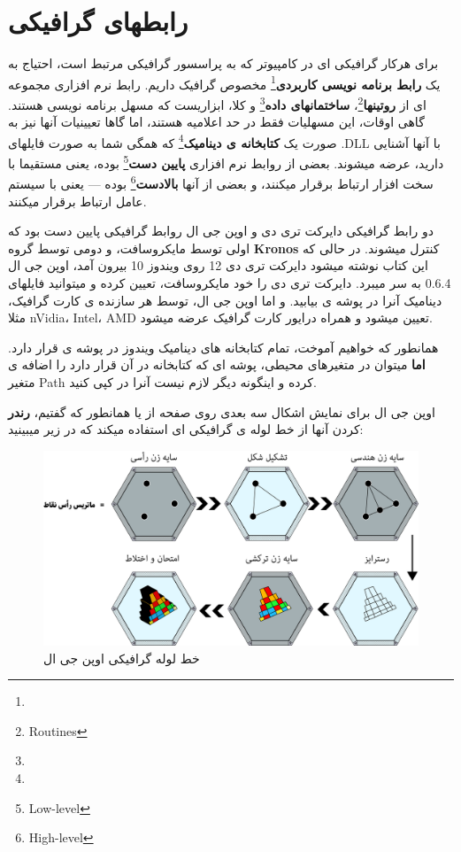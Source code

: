 \documentclass[14pt,a4paper]{memoir}
\begin{document}
	 \section{رابطهای گرافیکی}\label{api}	 
	  
	  
	  برای هرکار گرافیکی ای در کامپیوتر که به پراسسور گرافیکی مرتبط است، احتیاج به یک \textbf{رابط برنامه نویسی کاربردی}\footnote{} مخصوص گرافیک داریم. رابط نرم افزاری مجموعه ای از \textbf{روتینها}\footnote{Routines}، \textbf{ساختمانهای داده}\footnote{} و کلا، ابزاریست که مسهل برنامه نویسی هستند. گاهی اوقات، این مسهلیات فقط در حد اعلامیه هستند، اما گاها تعیینیات آنها نیز به صورت یک \textbf{کتابخانه ی دینامیک}\footnote{} که همگی شما به صورت فایلهای .DLL با آنها آشنایی دارید، عرضه میشوند. بعضی از روابط نرم افزاری \textbf{پایین دست}\footnote{Low-level} بوده، یعنی مستقیما با سخت افزار ارتباط برقرار میکنند، و بعضی از آنها \textbf{بالادست}\footnote{High-level} بوده --- یعنی با سیستم عامل ارتباط برقرار میکنند. 
	  
	  
	 دو رابط گرافیکی دایرکت تری دی و  اوپن جی ال روابط گرافیکی پایین دست بود که اولی توسط مایکروسافت، و دومی توسط گروه \textbf{Kronos} کنترل میشوند. در حالی که این کتاب نوشته میشود دایرکت تری دی 12 روی ویندوز 10 بیرون آمد، اوپن جی ال 0.6.4 به سر میبرد. دایرکت تری دی را خود مایکروسافت، تعیین کرده و میتوانید فایلهای دینامیک آنرا در پوشه ی \textbf{} بیابید. و اما اوپن جی ال، توسط هر سازنده ی کارت گرافیک، مثلا nVidia، Intel، AMD تعیین میشود و همراه درایور کارت گرافیک عرضه میشود.
	 
	 \begin{tip}
	 	همانطور که خواهیم آموخت، تمام کتابخانه های دینامیک ویندوز در پوشه ی   قرار دارد. \textbf{اما} میتوان در متغیرهای محیطی، پوشه ای که کتابخانه در آن قرار دارد را اضافه ی متغیر Path کرده و اینگونه دیگر لازم نیست آنرا در  کپی کنید.
	 \end{tip} 
	 
	 
	 
	 اوپن جی ال برای نمایش اشکال سه بعدی روی صفحه از یا همانطور که گفتیم، \textbf{رندر} کردن آنها از خط لوله ی گرافیکی ای استفاده میکند که در زیر میبینید:
	 
	 
	 
	 \begin{figure}[H]
	 	\centering
	 	\includegraphics[scale=0.4]{Pipeline}
	 	\caption{خط لوله گرافیکی اوپن جی ال}
	 \end{figure}
	 
\end{document}
